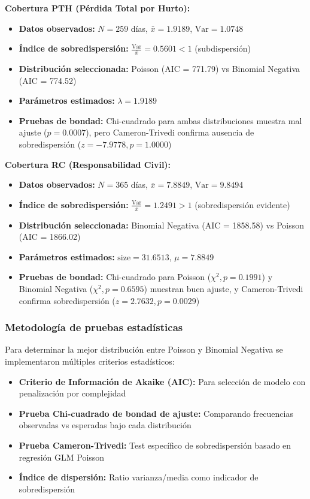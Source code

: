 \textbf{Cobertura PTH (Pérdida Total por Hurto):}
\begin{itemize}
    \item \textbf{Datos observados:} $N = 259$ días, $\bar{x} = 1.9189$, $\text{Var} = 1.0748$
    \item \textbf{Índice de sobredispersión:} $\frac{\text{Var}}{\bar{x}} = 0.5601 < 1$ (subdispersión)
    \item \textbf{Distribución seleccionada:} Poisson (AIC = 771.79) vs Binomial Negativa (AIC = 774.52)
    \item \textbf{Parámetros estimados:} $\lambda = 1.9189$
    \item \textbf{Pruebas de bondad:} Chi-cuadrado para ambas distribuciones muestra mal ajuste ($p = 0.0007$), pero Cameron-Trivedi confirma ausencia de sobredispersión ($z = -7.9778, p = 1.0000$)
\end{itemize}

\textbf{Cobertura RC (Responsabilidad Civil):}
\begin{itemize}
    \item \textbf{Datos observados:} $N = 365$ días, $\bar{x} = 7.8849$, $\text{Var} = 9.8494$
    \item \textbf{Índice de sobredispersión:} $\frac{\text{Var}}{\bar{x}} = 1.2491 > 1$ (sobredispersión evidente)
    \item \textbf{Distribución seleccionada:} Binomial Negativa (AIC = 1858.58) vs Poisson (AIC = 1866.02)
    \item \textbf{Parámetros estimados:} $\text{size} = 31.6513$, $\mu = 7.8849$
    \item \textbf{Pruebas de bondad:} Chi-cuadrado para Poisson ($\chi^2, p = 0.1991$) y Binomial Negativa ($\chi^2, p = 0.6595$) muestran buen ajuste, y Cameron-Trivedi confirma sobredispersión ($z = 2.7632, p = 0.0029$)
\end{itemize}

\subsubsection{Metodología de pruebas estadísticas}

Para determinar la mejor distribución entre Poisson y Binomial Negativa se implementaron múltiples criterios estadísticos:

\begin{itemize}
    \item \textbf{Criterio de Información de Akaike (AIC):} Para selección de modelo con penalización por complejidad
    \item \textbf{Prueba Chi-cuadrado de bondad de ajuste:} Comparando frecuencias observadas vs esperadas bajo cada distribución
    \item \textbf{Prueba Cameron-Trivedi:} Test específico de sobredispersión basado en regresión GLM Poisson
    \item \textbf{Índice de dispersión:} Ratio varianza/media como indicador de sobredispersión
\end{itemize}

